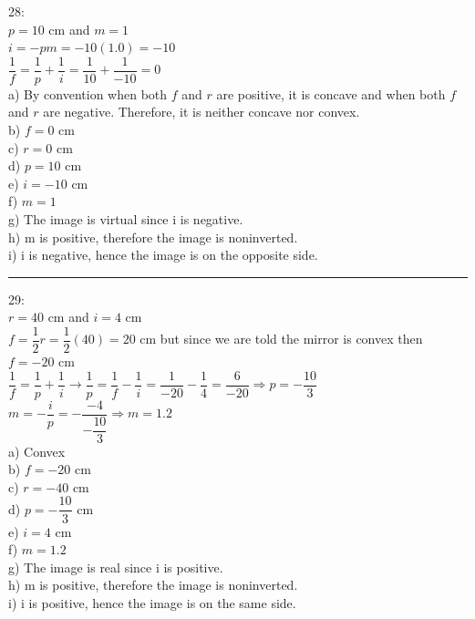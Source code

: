 \documentclass[fleqn]{article}
\begin{document}
\begin{enumerate}
    \textcolor{hwColor}{
      28: \\
      $p=10$ cm and $m=1$ \\
      $i=-pm=-10(1.0)=-10$ \\
      $\dfrac{1}{f}=\dfrac{1}{p}+\dfrac{1}{i}=\dfrac{1}{10}+\dfrac{1}{-10}=0$ \\
      a) By convention when both $f$ and $r$ are positive, it is concave and when both $f$ and $r$ are negative. Therefore, it is neither concave nor convex.  \\
      b) $f=0$ cm \\
      c) $r=0$ cm \\
      d) $p=10$ cm \\
      e) $i=-10$ cm \\
      f) $m=1$ \\
      g) The image is virtual since i is negative. \\
      h) m is positive, therefore the image is noninverted. \\
      i) i is negative, hence the image is on the opposite side. \\
    }

    \textcolor{hwColor}{
      \rule{15cm}{0.4pt}
    }

    \textcolor{hwColor}{
      29: \\
      $r=40$ cm and $i=4$ cm \\
      $f=\dfrac{1}{2}r=\dfrac{1}{2}(40)=20$ cm but since we are told the mirror is convex then $f=-20$ cm \\
      $\dfrac{1}{f}=\dfrac{1}{p}+\dfrac{1}{i} \rightarrow \dfrac{1}{p}=\dfrac{1}{f}-\dfrac{1}{i}=\dfrac{1}{-20}-\dfrac{1}{4}=\dfrac{6}{-20} \Longrightarrow p=-\dfrac{10}{3}$ \\
      $m=-\dfrac{i}{p}=-\dfrac{-4}{-\dfrac{10}{3}} \Longrightarrow m=1.2$ \\
      a) Convex \\
      b) $f=-20$ cm \\
      c) $r=-40$ cm \\
      d) $p=-\dfrac{10}{3}$ cm \\
      e) $i=4$ cm \\
      f) $m=1.2$ \\
      g) The image is real since i is positive. \\
      h) m is positive, therefore the image is noninverted. \\
      i) i is positive, hence the image is on the same side. \\
    }



\end{enumerate}
\end{document}
